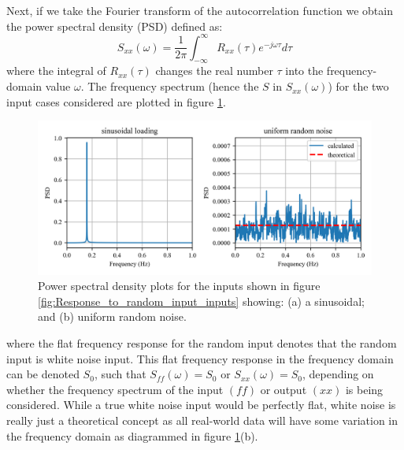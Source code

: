 \documentclass[12pt,letter]{article}
\numberwithin{ex}{section} %
\numberwithin{re}{section} %
\begin{document}
Next, if we take the Fourier transform of the autocorrelation function we obtain the power spectral density (PSD) defined as:
\begin{equation}
S_{xx}(\omega) =\frac{1}{2 \pi} \int_{-\infty}^{\infty} R_{xx}(\tau) e^{-j \omega \tau}d \tau
\end{equation}
where the integral of $R_{xx}(\tau)$ changes the real number $\tau$ into the frequency-domain value $\omega$. The frequency spectrum (hence the $S$ in $S_{xx}(\omega)$) for the two input cases considered are plotted in figure \ref{fig:Response_to_random_input_PSD}.
\begin{figure}[H]
	\centering
	\includegraphics[width=1\textwidth]{../Figures/Response_to_random_input_PSD.png}
	\caption{Power spectral density plots for the inputs shown in figure \ref{fig:Response_to_random_input_inputs} showing: (a) a sinusoidal; and (b) uniform random noise.}
	\label{fig:Response_to_random_input_PSD}
\end{figure}
\noindent where the flat frequency response for the random input denotes that the random input is white noise input.  This flat frequency response in the frequency domain can be denoted $S_0$, such that $S_{ff}(\omega) = S_0$ or $S_{xx}(\omega) = S_0$, depending on whether the frequency spectrum of the input $(ff)$ or output  $(xx)$ is being considered. While a true white noise input would be perfectly flat, white noise is really just a theoretical concept as all real-world data will have some variation in the frequency domain as diagrammed in figure \ref{fig:Response_to_random_input_PSD}(b). 
\end{document}
